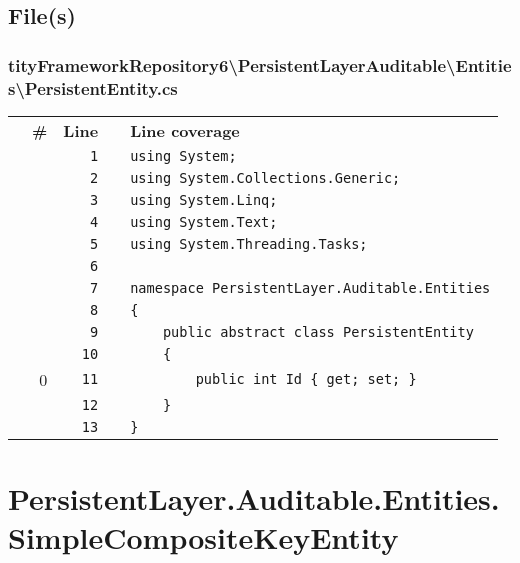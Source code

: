 \documentclass[a4paper,10pt]{article}
\begin{document}
\subsection{File(s)}
\subsubsection{tityFrameworkRepository6\textbackslash PersistentLayerAuditable\textbackslash Entities\textbackslash PersistentEntity.cs}
\begin{longtable}[l]{lrrll}
\textbf{} & \textbf{\#} & \textbf{Line} & \textbf{} & \textbf{Line coverage}\\
\cellcolor{gray} &  & \verb~1~ & & \verb~using System;~\\
\cellcolor{gray} &  & \verb~2~ & & \verb~using System.Collections.Generic;~\\
\cellcolor{gray} &  & \verb~3~ & & \verb~using System.Linq;~\\
\cellcolor{gray} &  & \verb~4~ & & \verb~using System.Text;~\\
\cellcolor{gray} &  & \verb~5~ & & \verb~using System.Threading.Tasks;~\\
\cellcolor{gray} &  & \verb~6~ & & \verb~~\\
\cellcolor{gray} &  & \verb~7~ & & \verb~namespace PersistentLayer.Auditable.Entities~\\
\cellcolor{gray} &  & \verb~8~ & & \verb~{~\\
\cellcolor{gray} &  & \verb~9~ & & \verb~    public abstract class PersistentEntity~\\
\cellcolor{gray} &  & \verb~10~ & & \verb~    {~\\
\cellcolor{red} & 0 & \verb~11~ & & \verb~        public int Id { get; set; }~\\
\cellcolor{gray} &  & \verb~12~ & & \verb~    }~\\
\cellcolor{gray} &  & \verb~13~ & & \verb~}~\\
\end{longtable}
\newpage
\section{PersistentLayer.Auditable.Entities.SimpleCompositeKeyEntity}
\end{document}
